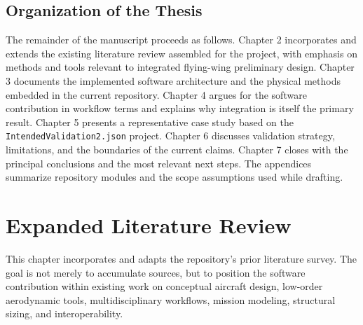 \documentclass[12pt]{report}
\begin{document}
\section{Organization of the Thesis}
The remainder of the manuscript proceeds as follows. Chapter 2 incorporates and extends the existing literature review assembled for the project, with emphasis on methods and tools relevant to integrated flying-wing preliminary design. Chapter 3 documents the implemented software architecture and the physical methods embedded in the current repository. Chapter 4 argues for the software contribution in workflow terms and explains why integration is itself the primary result. Chapter 5 presents a representative case study based on the \texttt{IntendedValidation2.json} project. Chapter 6 discusses validation strategy, limitations, and the boundaries of the current claims. Chapter 7 closes with the principal conclusions and the most relevant next steps. The appendices summarize repository modules and the scope assumptions used while drafting.

\chapter{Expanded Literature Review}
This chapter incorporates and adapts the repository's prior literature survey. The goal is not merely to accumulate sources, but to position the software contribution within existing work on conceptual aircraft design, low-order aerodynamic tools, multidisciplinary workflows, mission modeling, structural sizing, and interoperability.

\begingroup
\let\litsection\section
\let\litsubsection\subsection
\let\litsubsubsection\subsubsection
\renewcommand{\chapter}[1]{\litsection{#1}}
\renewcommand{\section}[1]{\litsubsection{#1}}
\renewcommand{\subsection}[1]{\litsubsubsection{#1}}

\endgroup
\end{document}
